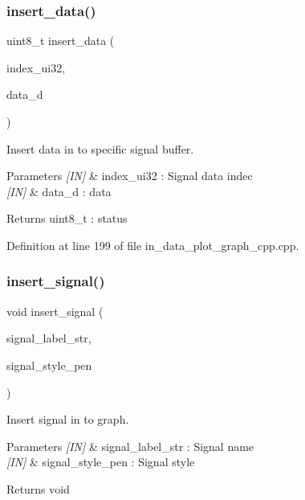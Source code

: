 \subsubsection{insert\_data()}
{\footnotesize\ttfamily uint8\+\_\+t insert\+\_\+data (\begin{DoxyParamCaption}\item[{uint32\+\_\+t}]{index\+\_\+ui32,  }\item[{double}]{data\+\_\+d }\end{DoxyParamCaption})}



Insert data in to specific signal buffer. 


\begin{DoxyParams}{Parameters}
{\em \mbox{[}\+I\+N\mbox{]}} & index\+\_\+ui32 \+: Signal data indec \\
\hline
{\em \mbox{[}\+I\+N\mbox{]}} & data\+\_\+d \+: data \\
\hline
\end{DoxyParams}
\begin{DoxyReturn}{Returns}
uint8\+\_\+t \+: status 
\end{DoxyReturn}


Definition at line 199 of file in\+\_\+data\+\_\+plot\+\_\+graph\+\_\+cpp.\+cpp.

\mbox{\label{group___data__plot_gacd716863a5493205aa1a5131c1c530f7}} 
\subsubsection{insert\_signal()}
{\footnotesize\ttfamily void insert\+\_\+signal (\begin{DoxyParamCaption}\item[{wx\+String}]{signal\+\_\+label\+\_\+str,  }\item[{wx\+Pen}]{signal\+\_\+style\+\_\+pen }\end{DoxyParamCaption})}



Insert signal in to graph. 


\begin{DoxyParams}{Parameters}
{\em \mbox{[}\+I\+N\mbox{]}} & signal\+\_\+label\+\_\+str \+: Signal name \\
\hline
{\em \mbox{[}\+I\+N\mbox{]}} & signal\+\_\+style\+\_\+pen \+: Signal style \\
\hline
\end{DoxyParams}
\begin{DoxyReturn}{Returns}
void 
\end{DoxyReturn}


